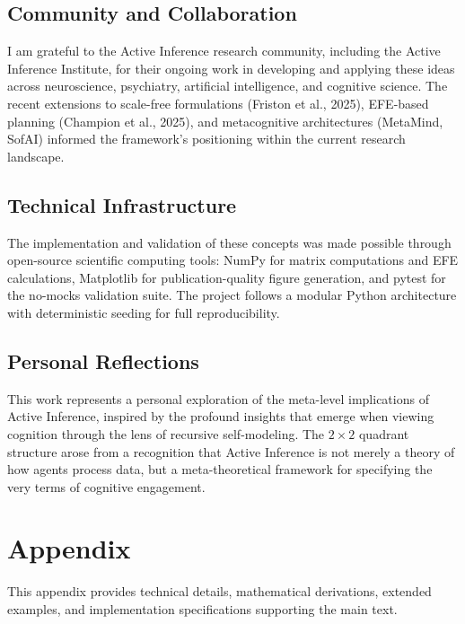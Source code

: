\documentclass[
]{article}
\begin{document}
\subsection{Community and
Collaboration}\label{community-and-collaboration}

I am grateful to the Active Inference research community, including the
Active Inference Institute, for their ongoing work in developing and
applying these ideas across neuroscience, psychiatry, artificial
intelligence, and cognitive science. The recent extensions to scale-free
formulations (Friston et al., 2025), EFE-based planning (Champion et
al., 2025), and metacognitive architectures (MetaMind, SofAI) informed
the framework's positioning within the current research landscape.

\subsection{Technical Infrastructure}\label{technical-infrastructure}

The implementation and validation of these concepts was made possible
through open-source scientific computing tools: NumPy for matrix
computations and EFE calculations, Matplotlib for publication-quality
figure generation, and pytest for the no-mocks validation suite. The
project follows a modular Python architecture with deterministic seeding
for full reproducibility.

\subsection{Personal Reflections}\label{personal-reflections}

This work represents a personal exploration of the meta-level
implications of Active Inference, inspired by the profound insights that
emerge when viewing cognition through the lens of recursive
self-modeling. The \(2 \times 2\) quadrant structure arose from a
recognition that Active Inference is not merely a theory of how agents
process data, but a meta-theoretical framework for specifying the very
terms of cognitive engagement.

\newpage

\section{Appendix}\label{sec:appendix}

This appendix provides technical details, mathematical derivations,
extended examples, and implementation specifications supporting the main
text.
\end{document}
